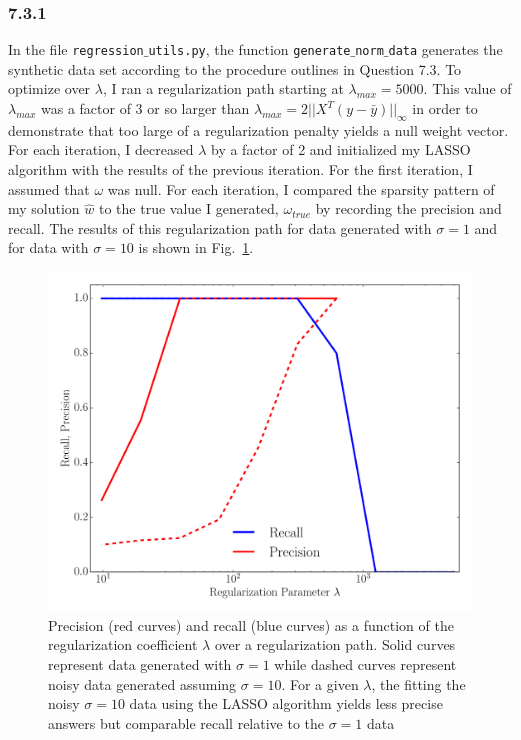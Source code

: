 \documentclass[12pt]{amsart}
\begin{document}
\subsubsection*{7.3.1}

In the file {\tt regression$\_$utils.py}, the function {\tt generate$\_$norm$\_$data} generates the synthetic data set according to the procedure outlines in Question 7.3.  To optimize over $\lambda$, I ran a regularization path starting at $\lambda_{max} = 5000$.  This value of  $\lambda_{max}$ was a factor of 3 or so larger than $\lambda_{max} = 2 ||X^{T}(y - \bar{y}) ||_{\infty}$ in order to demonstrate that too large of a regularization penalty yields a null weight vector.  For each iteration, I decreased $\lambda$ by a factor of 2 and initialized my LASSO algorithm with the results of the previous iteration.  For the first iteration, I assumed that $\omega$ was null.  For each iteration, I compared the sparsity pattern of my solution $\hat{w}$ to the true value I generated, $\omega_{true}$ by recording the precision and recall. The results of this regularization path for data generated with $\sigma = 1$ and for data with $\sigma = 10$ is shown in Fig.~\ref{fig:synth_reg}.

\begin{figure}
	\includegraphics[width=\columnwidth]{synthetic_prec_rec.pdf}
    \caption{Precision (red curves) and recall (blue curves) as a function of the regularization coefficient $\lambda$ over a regularization path.  Solid curves represent data generated with $\sigma = 1$ while dashed curves represent noisy data generated assuming $\sigma = 10$.  For a given $\lambda$, the fitting the noisy $\sigma = 10$ data using the LASSO algorithm yields less precise answers but comparable recall relative to the $\sigma = 1$ data}
    \label{fig:synth_reg}
\end{figure}
\end{document}
